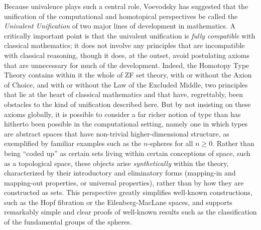 \documentclass[11pt]{article}
\theoremstyle{remark}
\theoremstyle{definition}
\begin{document}
Because univalence plays such a central role, Voevodsky has suggested that the unification of the computational and homotopical perspectives be called the \emph{Univalent Unification} of two major lines of development in mathematics.  A critically important point is that the univalent unification is \emph{fully compatible} with classical mathematics; it does not involve any principles that are incompatible with classical reasoning, though it does, at the outset, avoid postulating axioms that are unnecessary for much of the development.  Indeed, the Homotopy Type Theory contains within it the whole of ZF set theory, with or without the Axion of Choice, and with or without the Law of the Excluded Middle, two principles that lie at the heart of classical mathematics and that have, regrettably, been obstacles to the kind of unification described here.  But by not insisting on these axioms globally, it is possible to consider a far richer notion of type than has hitherto been possible in the computational setting, namely one in which types are abstract spaces that have non-trivial higher-dimensional structure, as exemplified by familiar examples such as the $n$-spheres for all $n\geq 0$.  Rather than being ``coded up'' as certain sets living within certain conceptions of space, such as a topological space, these objects arise \emph{synthetically} within the theory, characterized by their introductory and eliminatory forms (mapping-in and mapping-out properties, or universal properties), rather than by how they are constructed as sets.  This perspective greatly simplifies well-known constructions, such as the Hopf fibration or the Eilenberg-MacLane spaces, and supports remarkably simple and clear proofs of well-known results such as the classification of the fundamental groups of the spheres.
\end{document}

